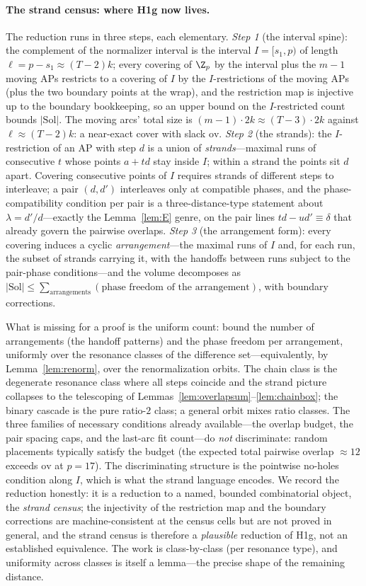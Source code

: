 \paragraph{The strand census: where H1g now lives.}
The reduction runs in three steps, each elementary. \emph{Step 1}
(the interval spine): the complement of the normalizer interval is the
interval $I=[s_1,p)$ of length $\ell=p-s_1\approx(T-2)k$; every
covering of $\Z_p$ by the interval plus the $m-1$ moving APs restricts
to a covering of $I$ by the $I$-restrictions of the moving APs (plus
the two boundary points at the wrap), and the restriction map is
injective up to the boundary bookkeeping, so an upper bound on the
$I$-restricted count bounds $|\mathrm{Sol}|$. The moving arcs' total
size is $(m-1)\cdot2k\approx(T-3)\cdot2k$ against
$\ell\approx(T-2)k$: a near-exact cover with slack $\mathrm{ov}$.
\emph{Step 2} (the strands): the $I$-restriction of an AP with step
$d$ is a union of \emph{strands}---maximal runs of consecutive $t$
whose points $a+td$ stay inside $I$; within a strand the points sit $d$
apart. Covering consecutive points of $I$ requires strands of
different steps to interleave; a pair $(d,d')$ interleaves only at
compatible phases, and the phase-compatibility condition per pair is
a three-distance-type statement about $\lambda=d'/d$---exactly the
Lemma~\ref{lem:E} genre, on the pair lines $td-ud'\equiv\delta$ that
already govern the pairwise overlaps. \emph{Step 3} (the arrangement
form): every covering induces a cyclic \emph{arrangement}---the
maximal runs of $I$ and, for each run, the subset of strands carrying
it, with the handoffs between runs subject to the pair-phase
conditions---and the volume decomposes as
$|\mathrm{Sol}|\le\sum_{\text{arrangements}}(\text{phase freedom of
the arrangement})$, with boundary corrections.

What is missing for a proof is the uniform count: bound the number of
arrangements (the handoff patterns) and the phase freedom per
arrangement, uniformly over the resonance classes of the difference
set---equivalently, by Lemma~\ref{lem:renorm}, over the
renormalization orbits. The chain class is the degenerate resonance
class where all steps coincide and the strand picture collapses to the
telescoping of Lemmas~\ref{lem:overlapsum}--\ref{lem:chainbox}; the
binary cascade is the pure ratio-$2$ class; a general orbit mixes
ratio classes. The three families of necessary conditions already
available---the overlap budget, the pair spacing caps, and the
last-arc fit count---do \emph{not} discriminate: random placements
typically satisfy the budget (the expected total pairwise overlap
$\approx12$ exceeds $\mathrm{ov}$ at $p=17$). The discriminating
structure is the pointwise no-holes condition along $I$, which is what
the strand language encodes. We record the reduction honestly: it is a
reduction to a named, bounded combinatorial object, the \emph{strand
census}; the injectivity of the restriction map and the boundary
corrections are machine-consistent at the census cells but are not
proved in general, and the strand census is therefore a
\emph{plausible} reduction of H1g, not an established equivalence. The
work is class-by-class (per resonance type), and uniformity across
classes is itself a lemma---the precise shape of the remaining distance.

